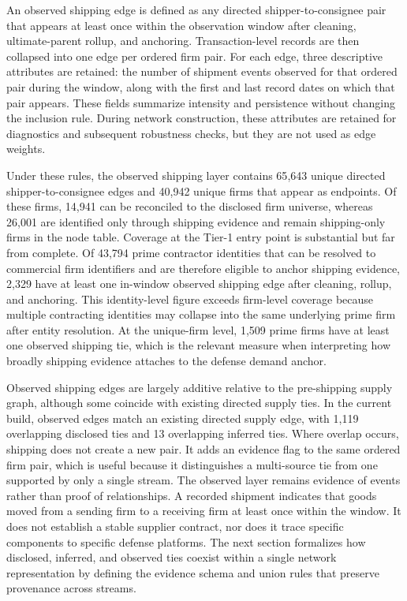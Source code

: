 An observed shipping edge is defined as any directed shipper-to-consignee pair that appears at least once within the observation window after cleaning, ultimate-parent rollup, and anchoring. Transaction-level records are then collapsed into one edge per ordered firm pair. For each edge, three descriptive attributes are retained: the number of shipment events observed for that ordered pair during the window, along with the first and last record dates on which that pair appears. These fields summarize intensity and persistence without changing the inclusion rule. During network construction, these attributes are retained for diagnostics and subsequent robustness checks, but they are not used as edge weights.

Under these rules, the observed shipping layer contains 65{,}643 unique directed shipper-to-consignee edges and 40{,}942 unique firms that appear as endpoints. Of these firms, 14{,}941 can be reconciled to the disclosed firm universe, whereas 26{,}001 are identified only through shipping evidence and remain shipping-only firms in the node table. Coverage at the Tier-1 entry point is substantial but far from complete. Of 43{,}794 prime contractor identities that can be resolved to commercial firm identifiers and are therefore eligible to anchor shipping evidence, 2{,}329 have at least one in-window observed shipping edge after cleaning, rollup, and anchoring. This identity-level figure exceeds firm-level coverage because multiple contracting identities may collapse into the same underlying prime firm after entity resolution. At the unique-firm level, 1{,}509 prime firms have at least one observed shipping tie, which is the relevant measure when interpreting how broadly shipping evidence attaches to the defense demand anchor.

Observed shipping edges are largely additive relative to the pre-shipping supply graph, although some coincide with existing directed supply ties. In the current build, \ShippingOverlap observed edges match an existing directed supply edge, with 1{,}119 overlapping disclosed ties and 13 overlapping inferred ties. Where overlap occurs, shipping does not create a new pair. It adds an evidence flag to the same ordered firm pair, which is useful because it distinguishes a multi-source tie from one supported by only a single stream. The observed layer remains evidence of events rather than proof of relationships. A recorded shipment indicates that goods moved from a sending firm to a receiving firm at least once within the window. It does not establish a stable supplier contract, nor does it trace specific components to specific defense platforms. The next section formalizes how disclosed, inferred, and observed ties coexist within a single network representation by defining the evidence schema and union rules that preserve provenance across streams.

